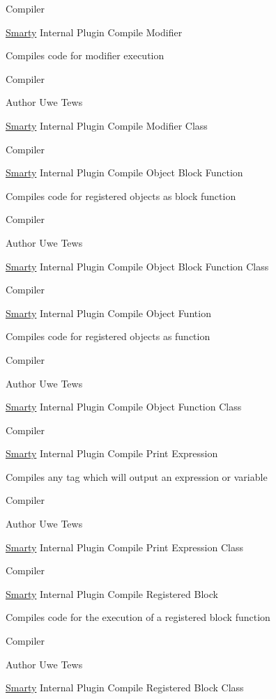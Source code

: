 Compiler

\hyperlink{class_smarty}{Smarty} Internal Plugin Compile Modifier

Compiles code for modifier execution

Compiler \begin{DoxyAuthor}{Author}
Uwe Tews
\end{DoxyAuthor}
\hyperlink{class_smarty}{Smarty} Internal Plugin Compile Modifier Class

Compiler

\hyperlink{class_smarty}{Smarty} Internal Plugin Compile Object Block Function

Compiles code for registered objects as block function

Compiler \begin{DoxyAuthor}{Author}
Uwe Tews
\end{DoxyAuthor}
\hyperlink{class_smarty}{Smarty} Internal Plugin Compile Object Block Function Class

Compiler

\hyperlink{class_smarty}{Smarty} Internal Plugin Compile Object Funtion

Compiles code for registered objects as function

Compiler \begin{DoxyAuthor}{Author}
Uwe Tews
\end{DoxyAuthor}
\hyperlink{class_smarty}{Smarty} Internal Plugin Compile Object Function Class

Compiler

\hyperlink{class_smarty}{Smarty} Internal Plugin Compile Print Expression

Compiles any tag which will output an expression or variable

Compiler \begin{DoxyAuthor}{Author}
Uwe Tews
\end{DoxyAuthor}
\hyperlink{class_smarty}{Smarty} Internal Plugin Compile Print Expression Class

Compiler

\hyperlink{class_smarty}{Smarty} Internal Plugin Compile Registered Block

Compiles code for the execution of a registered block function

Compiler \begin{DoxyAuthor}{Author}
Uwe Tews
\end{DoxyAuthor}
\hyperlink{class_smarty}{Smarty} Internal Plugin Compile Registered Block Class

